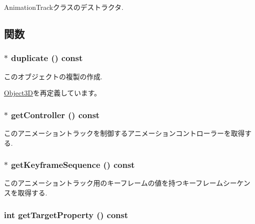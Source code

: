 AnimationTrackクラスのデストラクタ. 

\subsection{関数}
\hypertarget{classm3g_1_1AnimationTrack_e19aae30ee68ef05afd74ec9c19cf7d1}{
\subsubsection[{duplicate}]{ $\ast$ duplicate () const}}
\label{classm3g_1_1AnimationTrack_e19aae30ee68ef05afd74ec9c19cf7d1}


このオブジェクトの複製の作成. 

\hyperlink{classm3g_1_1Object3D_a25110dac934f867b83b73ad4741a0f4}{Object3D}を再定義しています。\hypertarget{classm3g_1_1AnimationTrack_3a54e89528127de5b4d0a48a2045a91c}{
\subsubsection[{getController}]{ $\ast$ getController () const}}
\label{classm3g_1_1AnimationTrack_3a54e89528127de5b4d0a48a2045a91c}


このアニメーショントラックを制御するアニメーションコントローラーを取得する. \hypertarget{classm3g_1_1AnimationTrack_e83c81771a8329e1e5f978f228c0b308}{
\subsubsection[{getKeyframeSequence}]{ $\ast$ getKeyframeSequence () const}}
\label{classm3g_1_1AnimationTrack_e83c81771a8329e1e5f978f228c0b308}


このアニメーショントラック用のキーフレームの値を持つキーフレームシーケンスを取得する. \hypertarget{classm3g_1_1AnimationTrack_143de0bf90b434f1487caae5b0b66bbf}{
\subsubsection[{getTargetProperty}]{\setlength{\rightskip}{0pt plus 5cm}int getTargetProperty () const}}
\label{classm3g_1_1AnimationTrack_143de0bf90b434f1487caae5b0b66bbf}


